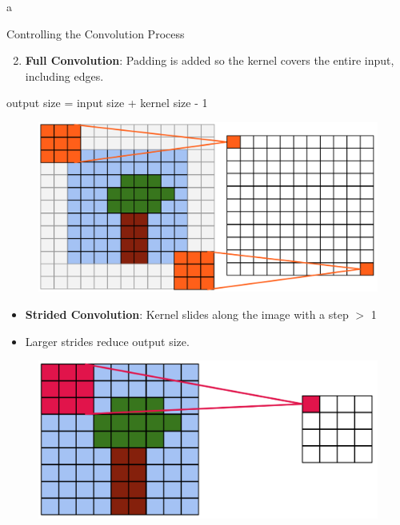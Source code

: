 a\documentclass[10pt]{beamer}
\theoremstyle{remark}
\theoremstyle{definition}
\begin{document}
\begin{frame}[allowframebreaks]{Controlling the Convolution Process}
\framebreak

\begin{itemize}
    \begin{enumerate}
    \setcounter{enumi}{1}
    \item \textbf{Full Convolution}:  Padding is added so the kernel covers the entire input, including edges. 
    \end{enumerate}
    \begin{itemize}
    output size = input size + kernel size - 1
    \end{itemize}
\end{itemize}


\begin{figure}
\centering
\includegraphics[width=1.0\textwidth,height=0.8\textheight,keepaspectratio]{./images/pad_2.png}
\end{figure}
    
\framebreak

\begin{itemize}
    \item \textbf{Strided Convolution}: Kernel slides along the image with a step $>$ 1
    \item Larger strides reduce output size.
\end{itemize}


\begin{figure}
\centering
\includegraphics[width=1.0\textwidth,height=0.8\textheight,keepaspectratio]{./images/stride_1.png}
\end{figure}



\end{frame}
\end{document}
